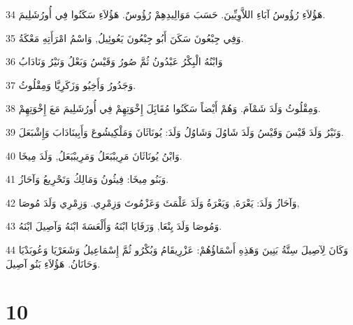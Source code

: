 \par 34 هَؤُلاَءِ رُؤُوسُ آبَاءِ اللاَّوِيِّينَ. حَسَبَ مَوَالِيدِهِمْ رُؤُوسٌ. هَؤُلاَءِ سَكَنُوا فِي أُورُشَلِيمَ.
\par 35 وَفِي جِبْعُونَ سَكَنَ أَبُو جِبْعُونَ يَعُوئِيلُ, وَاسْمُ امْرَأَتِهِ مَعْكَةُ.
\par 36 وَابْنُهُ الْبِكْرُ عَبْدُونُ ثُمَّ صُورُ وَقَيْسُ وَبَعْلُ وَنَيْرُ وَنَادَابُ
\par 37 وَجَدُورُ وَأَخِيُو وَزَكَرِيَّا وَمِقْلُوثُ.
\par 38 وَمِقْلُوثُ وَلَدَ شَمْآمَ. وَهُمْ أَيْضاً سَكَنُوا مُقَابَِلَ إِخْوَتِهِمْ فِي أُورُشَلِيمَ مَعَ إِخْوَتِهِمْ.
\par 39 وَنَيْرُ وَلَدَ قَيْسَ وَقَيْسُ وَلَدَ شَاوُلَ وَشَاوُلُ وَلَدَ: يُونَاثَانَ وَمَلْكِيشُوعَ وَأَبِينَادَابَ وَإِشْبَعَلَ.
\par 40 وَابْنُ يُونَاثَانَ مَرِيبْبَعَلُ وَمَرِيبْبَعَلُ, وَلَدَ مِيخَا.
\par 41 وَبَنُو مِيخَا: فِيثُونُ وَمَالِكُ وَتَحْرِيعُ وَآحَازُ.
\par 42 وَآحَازُ وَلَدَ: يَعْرَةَ, وَيَعْرَةُ وَلَدَ عَلْمَثَ وَعَزْمُوتَ وَزِمْرِي. وَزِمْرِي وَلَدَ مُوصَا,
\par 43 وَمُوصَا وَلَدَ يِنْعَا, وَرَفَايَا ابْنَهُ وَأَلْعَسَةَ ابْنَهُ وَآصِيلَ ابْنَهُ.
\par 44 وَكَانَ لِآصِيلَ سِتَّةُ بَنِينَ وَهَذِهِ أَسْمَاؤُهُمْ: عَزْرِيقَامُ وَبُكْرُو ثُمَّ إِسْمَاعِيلُ وَشَعَرْيَا وَعُوبَدْيَا وَحَانَانُ. هَؤُلاَءِ بَنُو آصِيلَ.

\chapter{10}

